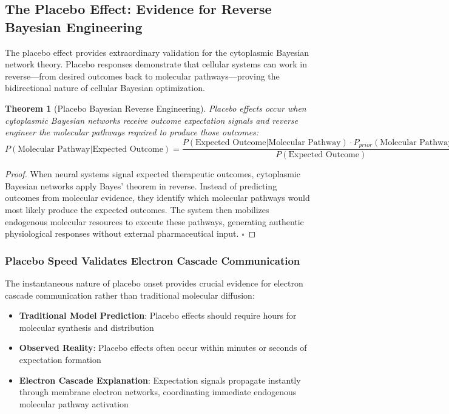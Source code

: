 \documentclass[12pt,a4paper]{article}
\newtheorem{theorem}{Theorem}[section]
\begin{document}
\subsection{The Placebo Effect: Evidence for Reverse Bayesian Engineering}

The placebo effect provides extraordinary validation for the cytoplasmic Bayesian network theory. Placebo responses demonstrate that cellular systems can work in reverse—from desired outcomes back to molecular pathways—proving the bidirectional nature of cellular Bayesian optimization.

\begin{theorem}[Placebo Bayesian Reverse Engineering]
Placebo effects occur when cytoplasmic Bayesian networks receive outcome expectation signals and reverse engineer the molecular pathways required to produce those outcomes:
\begin{equation}
P(\text{Molecular Pathway}|\text{Expected Outcome}) = \frac{P(\text{Expected Outcome}|\text{Molecular Pathway}) \cdot P_{prior}(\text{Molecular Pathway})}{P(\text{Expected Outcome})}
\end{equation}
\end{theorem}

\begin{proof}
When neural systems signal expected therapeutic outcomes, cytoplasmic Bayesian networks apply Bayes' theorem in reverse. Instead of predicting outcomes from molecular evidence, they identify which molecular pathways would most likely produce the expected outcomes. The system then mobilizes endogenous molecular resources to execute these pathways, generating authentic physiological responses without external pharmaceutical input. $\square$
\end{proof}

\subsubsection{Placebo Speed Validates Electron Cascade Communication}

The instantaneous nature of placebo onset provides crucial evidence for electron cascade communication rather than traditional molecular diffusion:

\begin{itemize}
\item \textbf{Traditional Model Prediction}: Placebo effects should require hours for molecular synthesis and distribution
\item \textbf{Observed Reality}: Placebo effects often occur within minutes or seconds of expectation formation
\item \textbf{Electron Cascade Explanation}: Expectation signals propagate instantly through membrane electron networks, coordinating immediate endogenous molecular pathway activation
\end{itemize}
\end{document}
